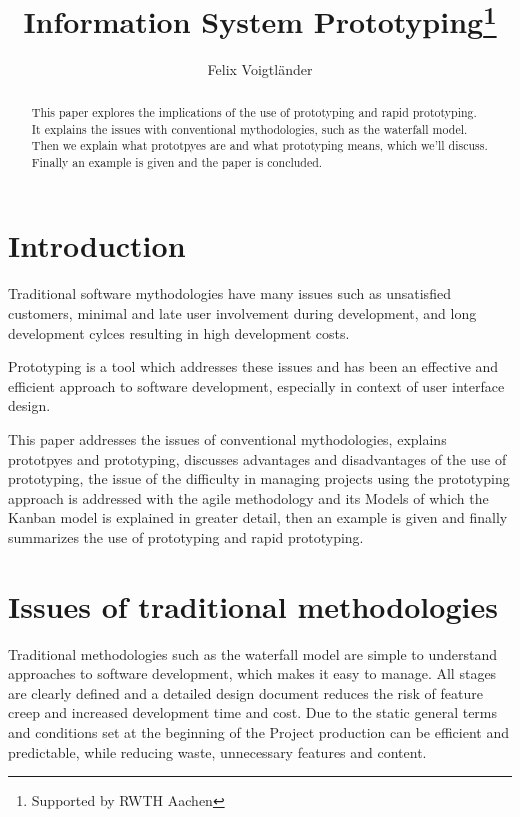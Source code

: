 \documentclass[runningheads]{llncs}
\begin{document}
%
\title{Information System Prototyping\thanks{Supported by RWTH Aachen}}
%
%
\author{Felix Voigtländer}
%
%
%
\maketitle              %
%
\begin{abstract}
This paper explores the implications of the use of prototyping and rapid prototyping.
It explains the issues with conventional mythodologies, such as the waterfall model.
Then we explain what prototpyes are and what prototyping means, which we'll discuss.
Finally an example is given and the paper is concluded.

\end{abstract}
%
%
%
\section{Introduction}
Traditional software mythodologies have many issues such as unsatisfied customers,
minimal and late user involvement during development, and long development cylces resulting
in high development costs.

Prototyping is a tool which addresses these issues and has been an effective and efficient
approach to software development, especially in context of user interface design.

This paper addresses the issues of conventional mythodologies, explains prototpyes and prototyping,
discusses advantages and disadvantages of the use of prototyping, the issue of the difficulty in
managing projects using the prototyping approach is addressed with the agile methodology
and its Models of which the Kanban model is explained in greater detail,
then an example is given and finally summarizes the use of prototyping and rapid prototyping.


\section{Issues of traditional methodologies}
Traditional methodologies such as the waterfall model \cite{ref_waterfall} 
are simple to understand approaches to software development, which makes it 
easy to manage. All stages are clearly defined and a detailed design document
reduces the risk of feature creep and increased development time and cost.
Due to the static general terms and conditions set at the beginning of the Project
production can be efficient and predictable, while reducing waste, unnecessary features
and content.
\end{document}
